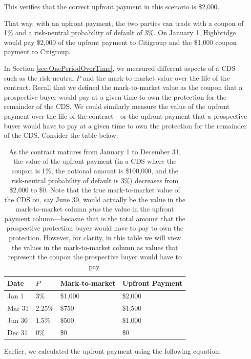 \documentclass{jss}
\begin{document}
This verifies that the correct upfront payment in this scenario is \$2,000. 

That way, with an upfront payment, the two parties can trade with a coupon of 1\% and a risk-neutral probability of default of 3\%. On January 1, Highbridge would pay \$2,000 of the upfront payment to Citigroup and the \$1,000 coupon payment to Citigroup.

In Section \ref{sec:OnePeriodOverTime}, we measured different aspects of a CDS such as the risk-neutral $P$ and the mark-to-market value over the life of the contract. Recall that we defined the mark-to-market value as the coupon that a prospective buyer would pay at a given time to own the protection for the remainder of the CDS. We could similarly measure the value of the upfront payment over the life of the contract---or the upfront payment that a prospective buyer would have to pay at a given time to own the protection for the remainder of the CDS. Consider the table below:

\begin{table}[H]
\centering
{\footnotesize
\begin{tabular}{llll}
  \hline
Date & $P$ & Mark-to-market & Upfront Payment \\ 
  \hline
  Jan 1 & 3\% & \$1,000 & \$2,000  \\ 
  Mar 31 & 2.25\% & \$750 & \$1,500 \\ 
  Jun 30 & 1.5\% & \$500 & \$1,000 \\ 
  Dec 31 & 0\% & \$0 & \$0 \\
   \hline
\end{tabular}
}
\caption{As the contract matures from January 1 to December 31, the value of the upfront payment (in a CDS where the coupon is 1\%, the notional amount is \$100,000, and the risk-neutral probability of default is 3\%) decreases from \$2,000 to \$0. Note that the true mark-to-market value of the CDS on, say June 30, would actually be the value in the mark-to-market column \emph{plus} the value in the upfront payment column---becasue that is the total amount that the prospective protection buyer would have to pay to own the protection. However, for clarity, in this table we will view the values in the mark-to-market column as values that represent the coupon the prospective buyer would have to pay.}
\label{tbl:upfrontValue}
\end{table}

Earlier, we calculated the upfront payment using the following equation:
\end{document}
